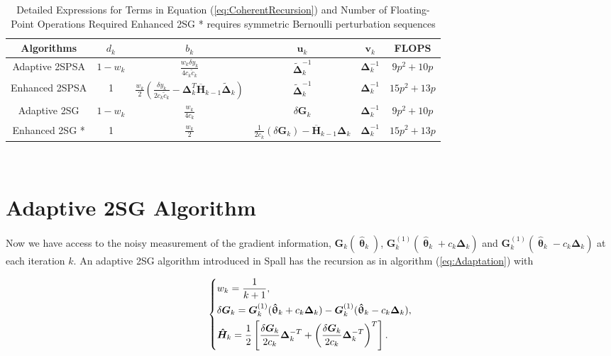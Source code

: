 \documentclass[conference]{IEEEtran}
\newcommand{\bG}{\bm{G}}
\newcommand{\bDelta}{\bm{\Delta}}
\newcommand{\oH}{\bm{\overline{H}}}
\newcommand{\hH}{\bm{\hat{H}}}
\newcommand{\htheta}{\bm{\hat{\uptheta}}}
\newcommand{\tDelta}{\bm{\tilde{\Delta}}}
\begin{document}
		
		\begin{table*}
			\centering
			\resizebox{1.95\columnwidth}{!}
			{
				\begin{tabular}{|c | c | c | c | c| c |}
					\hline
					Algorithms & $d_k$ & $b_k$ & $\bm{u}_k$ & $\bm{v}_k$ & FLOPS \\
					\hline
					Adaptive 2SPSA  & $1-w_k$ & $\frac{w_k \delta y_k}{4c_k\tilde{c}_k}$ & $\tDelta_k^{-1}$ & $\bDelta_k^{-1}$ & $9p^2+10p$\\
					Enhanced 2SPSA & 1 & $\frac{w_k}{2}(\frac{\delta y_k}{2c_k\tilde{c}_k}-\bDelta_k^{T}\oH_{k-1}\tDelta_k)$ & $\tDelta_k^{-1}$  & $\bDelta_k^{-1}$  & $15p^2 + 13p$\\
					Adaptive 2SG & $1-w_k$ & $\frac{w_k}{4c_k}$ & $\delta\bG_k$ & $\bDelta_k^{-1}$  & $9p^2 + 10p$\\
					Enhanced 2SG * & 1 & $\frac{w_k}{2}$ & $\frac{1}{2c_k}(\delta\bG_k) - \oH_{k-1}\bDelta_k $ & $\bDelta_k^{-1}$  & $15p^2 + 13p$\\
					\hline
				\end{tabular}
				
			}
			\\[5pt]
			\caption{Detailed Expressions for Terms in Equation (\ref{eq:CoherentRecursion}) and Number of Floating-Point Operations Required
				\newline
				{\scriptsize Enhanced 2SG * requires symmetric Bernoulli perturbation sequences} }  \label{tab:Summary}
		\end{table*}
		
	
	\section{Adaptive 2SG Algorithm} \label{2SG}
	Now we have access to the noisy measurement of the gradient information, $\bG_k(\htheta_k)$, $\bG_k^{(1)}(\htheta_k+ c_k\bDelta_k)$ and $\bG_k^{(1)}(\htheta_k- c_k\bDelta_k)$ at each iteration $k$. An adaptive 2SG algorithm introduced in Spall \cite{Spall2000} has the recursion as in algorithm (\ref{eq:Adaptation}) with
	
	\begin{equation} \label{eq:notationSG}
		\begin{dcases}
			w_k=\frac{1}{k+1},\\
			\delta\bG_k=\bG_k^{(1)}(\htheta_k+ c_k\bDelta_k)-\bG_k^{(1)}(\htheta_k- c_k\bDelta_k),\\
			\hH_k=\frac{1}{2}\left[ \frac{\delta\bG_k}{2c_k}\bDelta_k^{-T}+\left(\frac{\delta\bG_k}{2c_k}\bDelta_k^{-T}\right)^T \right].\\
		\end{dcases}
	\end{equation}
		
\end{document}
